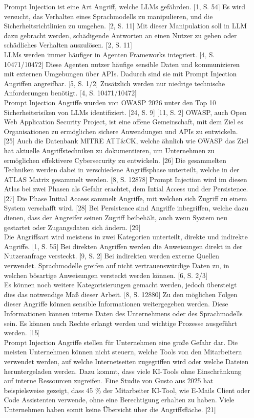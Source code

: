 Prompt Injection ist eine Art Angriff, welche LLMs gefährden. [1, S. 54] Es wird versucht, das Verhalten eines Sprachmodells zu manipulieren,
und die Sicherheitsrichtlinien zu umgehen. [2, S. 11] Mit dieser Manipulation soll in LLM dazu gebracht werden, schädigende
Antworten an einen Nutzer zu geben oder schädliches Verhalten auszulösen. [2, S. 11] \\
LLMs werden immer häufiger in Agenten Frameworks integriert. [4, S. 10471/10472] Diese Agenten nutzer häufige sensible Daten und kommunizieren
mit externen Umgebungen über APIs. Dadurch sind sie mit Prompt Injection Angriffen angreifbar. [5, S. 1/2]
Zusätzlich werden nur niedrige technische Anforderungen benötigt. [4, S. 10471/10472] \\
Prompt Injection Angriffe wurden von OWASP 2026 unter den Top 10 Sicherheitsrisiken von LLMs identifiziert. [24, S. 9] [11, S. 2]
OWASP, auch Open Web Application Security Project, ist eine offene Gemeinschaft, mit dem Ziel es Organisationen zu ermöglichen
sichere Anwendungen und APIs zu entwickeln. [25] Auch die Datenbank MITRE ATT\&CK, welche ähnlich wie OWASP das Ziel hat
aktuelle Angriffstechniken zu dokumentieren, um Unternehmen zu ermöglichen effektivere Cybersecurity zu entwickeln. [26]
Die gesammelten Techniken werden dabei in verschiedene Angriffsphase unterteilt, welche in der ATLAS Matrix gesammelt werden. [8, S. 12878]
Prompt Injection wird im diesen Atlas bei zwei Phasen als Gefahr erachtet, dem Intial Access und der Persistence. [27]
Die Phase Initial Access sammelt Angriffe, mit welchen sich Zugriff zu einem System verschafft wird. [28] Bei Persistence sind
Angriffe inbegriffen, welche dazu dienen, dass der Angreifer seinen Zugriff beibehält, auch wenn System neu gestartet oder
Zugangsdaten sich ändern. [29] \\
Die Angriffsart wird meistens in zwei Kategorien unterteilt, direkte und indirekte Angriffe. [1, S. 55] Bei direkten Angriffen
werden die Anweisungen direkt in der Nutzeranfrage versteckt. [9, S. 2] Bei indirekten werden externe Quellen verwendet.
Sprachmodelle greifen auf nicht vertrauenswürdige Daten zu, in welchen bösartige Anweisungen versteckt werden können. [6, S. 2/3] \\
Es können noch weitere Kategorisierungen gemacht werden, jedoch übersteigt dies das notwendige Maß dieser Arbeit. [8, S. 12880]
Zu den möglichen Folgen dieser Angriffe können sensible Informationen weitergegeben werden. Diese Informationen können
interne Daten des Unternehmens oder des Sprachmodells sein. Es können auch Rechte erlangt werden und wichtige Prozesse ausgeführt
werden. [15] \\
Prompt Injection Angriffe stellen für Unternehmen eine große Gefahr dar. Die meisten Unternehmen können nicht steuern, welche
Tools von den Mitarbeitern verwendet werden, auf welche Internetseiten zugegriffen wird oder welche Dateien heruntergeladen
werden. Dazu kommt, dass viele KI-Tools ohne Einschränkung auf interne Ressourcen zugreifen. Eine Studie von Gusto aus
2025 hat beispielsweise gezeigt, dass 45 $\%$ der Mitarbeiter KI-Tool, wie E-Mails Client oder Code Assistenten verwende,
ohne eine Berechtigung erhalten zu haben. Viele Unternehmen haben somit keine Übersicht über die Angriffsfläche. [21]

